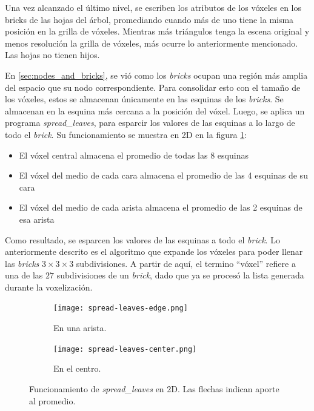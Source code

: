 Una vez alcanzado el último nivel, se escriben los atributos de los vóxeles en los bricks de las hojas del árbol, promediando cuando más de uno tiene la misma posición en la grilla de vóxeles.
Mientras más triángulos tenga la escena original y menos resolución la grilla de vóxeles, más ocurre lo anteriormente mencionado.
Las hojas no tienen hijos.

En \ref{sec:nodes_and_bricks}, se vió como los \textit{bricks} ocupan una región más amplia del espacio que su nodo correspondiente.
Para consolidar esto con el tamaño de los vóxeles, estos se almacenan únicamente en las esquinas de los \textit{bricks}. %
Se almacenan en la esquina más cercana a la posición del vóxel.
Luego, se aplica un programa \textit{spread\_leaves}, para esparcir los valores de las esquinas a lo largo de todo el \textit{brick}.
Su funcionamiento se muestra en 2D en la figura \ref{fig:spread-leaves}:
\begin{itemize}
    \item El vóxel central almacena el promedio de todas las 8 esquinas
    \item El vóxel del medio de cada cara almacena el promedio de las 4 esquinas de su cara
    \item El vóxel del medio de cada arista almacena el promedio de las 2 esquinas de esa arista
\end{itemize}
Como resultado, se esparcen los valores de las esquinas a todo el \textit{brick}.
Lo anteriormente descrito es el algoritmo que expande los vóxeles para poder llenar las \textit{bricks} $3\times3\times3$ subdivisiones.
A partir de aquí, el termino ``vóxel'' refiere a una de las $27$ subdivisiones de un \textit{brick}, dado que ya se procesó la lista generada durante la voxelización.

\begin{figure}
    \begin{subfigure}{.5\textwidth}
        \centering
        \texttt{[image: spread-leaves-edge.png]}
        \caption{En una arista.}
    \end{subfigure}
    \begin{subfigure}{.5\textwidth}
        \centering
        \texttt{[image: spread-leaves-center.png]}
        \caption{En el centro.}
    \end{subfigure}
    \caption{Funcionamiento de \textit{spread\_leaves} en 2D. Las flechas indican aporte al promedio.}
    \label{fig:spread-leaves}
\end{figure}


